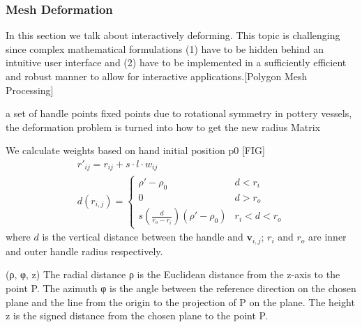 \subsubsection{Mesh Deformation}
\label{sec:4.2.3}
In this section we talk about interactively deforming. This topic is challenging since complex mathematical formulations (1) have to be hidden behind an intuitive user interface and (2) have to be implemented in a sufficiently efficient and robust manner to allow for interactive applications.[Polygon Mesh Processing] 

a set of handle points
fixed points
due to rotational symmetry in pottery vessels, the deformation problem is turned into how to get the new radius Matrix

We calculate weights based on hand initial position p0 [FIG]
\begin{equation}
\begin{split}
r'_{ij} = r_{ij} + s \cdot l \cdot w_{ij} \\
d(r_{i,j}) = \begin{cases}
\rho' - \rho_{0} &  d < r_{i} \\
0 &  d > r_{o} \\
s(\frac{d}{r_{o}-r_{i}}) (\rho' - \rho_{0}) &  r_{i} < d < r_{o}
\end{cases}
\end{split}
\end{equation}
where $d$ is the vertical distance between the handle and $\mathbf{v}_{i,j}$; $r_{i}$ and $r_{o}$ are inner and outer handle radius respectively. 

(ρ, φ, z) 
The radial distance ρ is the Euclidean distance from the z-axis to the point P.
The azimuth φ is the angle between the reference direction on the chosen plane and the line from the origin to the projection of P on the plane.
The height z is the signed distance from the chosen plane to the point P.

